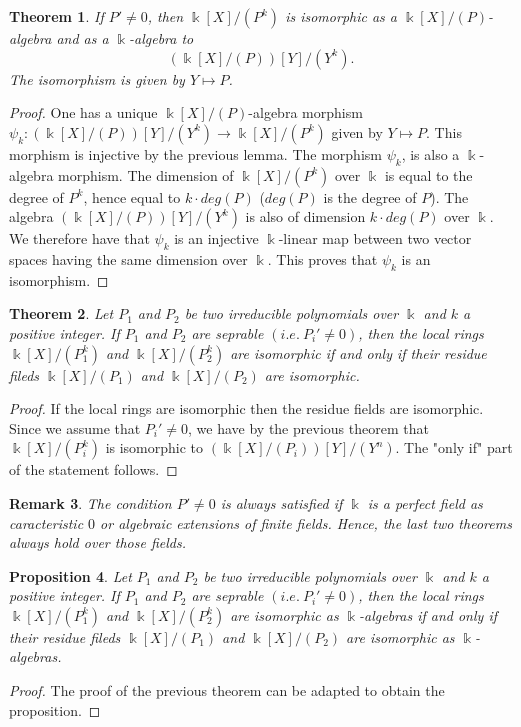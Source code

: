 \documentclass[12pt, reqno]{amsart}
\newtheorem{theorem}{Theorem}[section]
\newtheorem{proposition}[theorem]{Proposition}
\newtheorem{remark}[theorem]{Remark}
\newcommand{\K}{ {\Bbbk} }
\begin{document}
\begin{theorem}\label{thdec}
If $P'\neq 0$, then $\K[X]/(P^k)$ is isomorphic as a $\K[X]/(P)$-algebra and as a $\K$-algebra to $$(\K[X]/(P))[Y]/(Y^k).$$ The isomorphism is given by $Y\mapsto P$.
\end{theorem}
\begin{proof}
One has a unique $\K[X]/(P)$-algebra morphism $\psi_k: (\K[X]/(P))[Y]/(Y^k)\to \K[X]/(P^k)$ given by $Y\mapsto P$. This morphism is injective by the previous lemma. The morphism $\psi_k$, is also a $\K$-algebra morphism. The dimension of $\K[X]/(P^k)$ over $\K$ is equal to the degree of $P^k$, hence equal to $k \cdot deg(P)$ ($deg(P)$ is the degree of $P$). The algebra $(\K[X]/(P))[Y]/(Y^k)$ is also of dimension $k\cdot deg(P)$ over $\K$. We therefore have that $\psi_k$ is an injective $\K$-linear map between two vector spaces having the same dimension over $\K$. This proves that $\psi_k$ is an isomorphism. 
\end{proof}
\begin{theorem}\label{thres}
Let $P_1$ and $P_2$ be two irreducible polynomials over $\K$ and $k$ a positive integer. If $P_1$ and $P_2$ are seprable  $(i.e.\ P_i'\neq 0)$, then the local rings $\K[X]/(P_1^k)$ and $\K[X]/(P_2^k)$ are isomorphic if and only if their residue fileds $\K[X]/(P_1)$ and $\K[X]/(P_2)$ are isomorphic.
\end{theorem}
\begin{proof}
If the local rings are isomorphic then the residue fields are isomorphic. Since we assume that $P_i'\neq 0$, we have by the previous theorem that $\K[X]/(P_i^k)$ is isomorphic to $(\K[X]/(P_i))[Y]/(Y^n)$. The "only if" part of the statement follows. 
\end{proof}
\begin{remark}
The condition $P'\neq 0$ is always satisfied if $\K$ is a perfect field as caracteristic $0$ or algebraic extensions of finite fields. Hence, the last two theorems always hold over those fields.
\end{remark}
\begin{proposition}
Let $P_1$ and $P_2$ be two irreducible polynomials over $\K$ and $k$ a positive integer. If $P_1$ and $P_2$ are seprable  $(i.e.\ P_i'\neq 0)$, then the local rings $\K[X]/(P_1^k)$ and $\K[X]/(P_2^k)$ are isomorphic as $\K$-algebras if and only if their residue fileds $\K[X]/(P_1)$ and $\K[X]/(P_2)$ are isomorphic as $\K$-algebras.
\end{proposition}
\begin{proof}
The proof of the previous theorem can be adapted to obtain the proposition. 
\end{proof}
\end{document}
